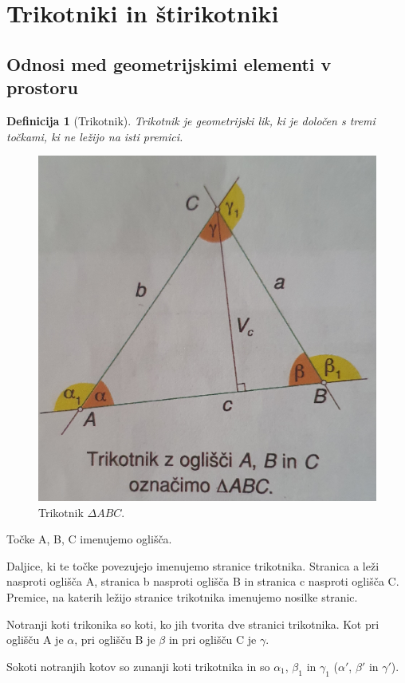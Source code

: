 \documentclass{article}
\newtheorem{definicija}{Definicija}[subsection]
\begin{document}
\pagestyle{empty}

\section{ Trikotniki in štirikotniki }
\subsection{ Odnosi med geometrijskimi elementi v prostoru }

\begin{definicija}[Trikotnik]
    Trikotnik je geometrijski lik, ki je določen s tremi točkami, ki ne ležijo na isti premici. 
\end{definicija}

\begin{figure}[h]
    \includegraphics[width=0.4\linewidth]{trikotnik.png}
    \centering
    \caption{Trikotnik $\Delta ABC$.}
\end{figure}

Točke A, B, C imenujemo oglišča.

Daljice, ki te točke povezujejo imenujemo stranice trikotnika.
Stranica a leži nasproti oglišča A, stranica b nasproti oglišča B in stranica c nasproti oglišča C. Premice, na katerih ležijo stranice trikotnika imenujemo nosilke stranic.

Notranji koti trikonika so koti, ko jih tvorita dve stranici trikotnika.
Kot pri oglišču A  je $\alpha$, pri oglišču B je $\beta$ in pri oglišču C je $\gamma$.

Sokoti notranjih kotov so zunanji koti trikotnika in so $\alpha_1$, $\beta_1$ in $\gamma_1$ ($\alpha'$, $\beta'$ in $\gamma'$).
\end{document}
